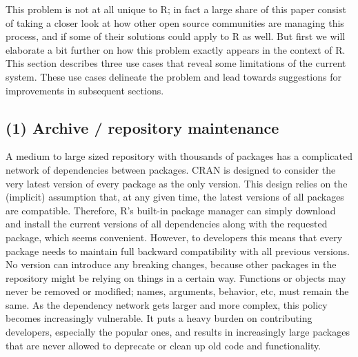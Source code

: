 This problem is not at all unique to R; in fact a large share of this paper
consist of taking a closer look at how other open source communities are
managing this process, and if some of their solutions could apply to R as
well. But first we will elaborate a bit further on how this problem exactly
appears in the context of R. This section describes three use cases that
reveal some limitations of the current system. These use cases delineate
the problem and lead towards suggestions for improvements in subsequent sections.

\subsection{(1) Archive / repository maintenance}

A medium to large sized repository with thousands of packages has a complicated
network of dependencies between packages. CRAN is designed to consider the very
latest version of every package as the only  version. This design
relies on the (implicit) assumption that, at any given time, the latest versions
of all packages are compatible. Therefore, R's built-in package manager can simply
download and install the current versions of all dependencies along with the
requested package, which seems convenient. However, to developers this means
that every package   needs to maintain full backward compatibility
with all previous versions. No version can introduce any breaking changes, because
other packages in the repository might be relying on things in a certain way.
Functions or objects may never be removed or modified; names, arguments, behavior,
etc, must remain the same. As the dependency network gets larger and more complex,
this policy becomes increasingly vulnerable. It puts a heavy burden on
contributing developers, especially the popular ones, and results in
increasingly large packages that are never allowed to deprecate or clean up
old code and functionality.

